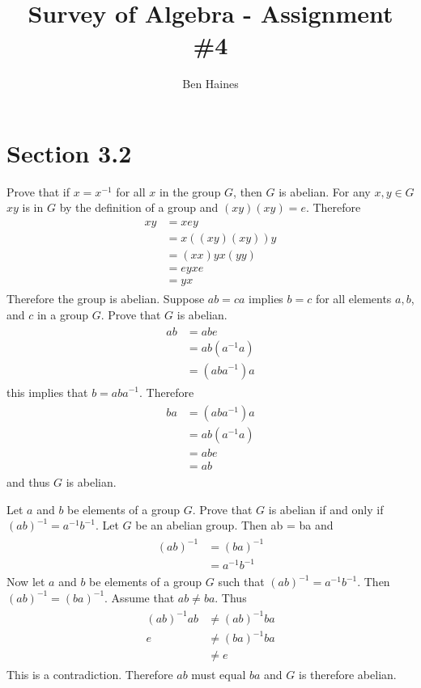 \documentclass[paper=a4, fontsize=11pt]{jhwhw} %
\begin{document}
\title{Survey of Algebra - Assignment \#4}
\author{Ben Haines}

\section*{Section 3.2}
Prove that if $x=x^{-1}$ for all $x$ in the group $G$, then $G$ is abelian.
\solution
For any $x,y \in G$ $xy$ is in $G$ by the definition of a group and $(xy)(xy) = e$. Therefore
\begin{align}
\begin{split}
xy &= xey\\
&= x((xy)(xy))y\\
&=(xx)yx(yy)\\
&= eyxe\\
&=yx
\end{split}
\end{align}
Therefore the group is abelian.
Suppose $ab = ca$ implies $b = c$ for all elements $a, b$, and $c$ in a group $G$. Prove that $G$ is abelian.
\solution
\begin{align}
\begin{split}
ab &= abe\\
&=ab(a^{-1}a)\\
&= (aba^{-1})a
\end{split}
\end{align}
this implies that $b = aba^{-1}$. Therefore 
\begin{align}
\begin{split}
ba &= (aba^{-1})a\\
&= ab(a^{-1}a)\\
&= abe\\
&= ab
\end{split}
\end{align}
and thus $G$ is abelian.

Let $a$ and $b$ be elements of a group $G$. Prove that $G$ is abelian if and only if $(ab)^{-1} = a^{-1}b^{-1}$.
\solution
Let $G$ be an abelian group. Then ab = ba and
\begin{align}
\begin{split}
(ab)^{-1} &= (ba)^{-1}\\
&= a^{-1}b^{-1}
\end{split}
\end{align}
Now let $a$ and $b$ be elements of a group $G$ such that $(ab)^{-1} = a^{-1}b^{-1}$. Then $(ab)^{-1} = (ba)^{-1}$. Assume that $ab \not = ba$. Thus
\begin{align}
\begin{split}
(ab)^{-1}ab &\not= (ab)^{-1}ba\\
e &\not= (ba)^{-1}ba\\
&\not = e
\end{split}
\end{align}
This is a contradiction. Therefore $ab$ must equal $ba$ and $G$ is therefore abelian.
\end{document}
